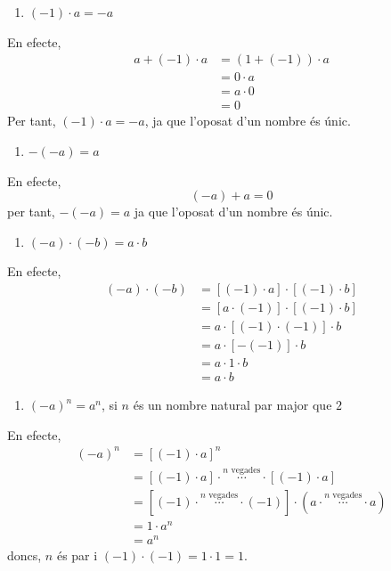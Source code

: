 \begin{enumerate}
\item[10.] $(-1)\cdot a=-a$
\end{enumerate}

En efecte,%
\begin{align*}
a+(-1)\cdot a &=(1+(-1))\cdot a \\
&=0\cdot a \\
&=a\cdot 0 \\
&=0
\end{align*}%
Per tant, $(-1)\cdot a=-a$, ja que l’oposat d’un nombre és únic.

\begin{enumerate}
\item[11.] $-(-a)=a$
\end{enumerate}

En efecte,%
\begin{equation*}
(-a)+a=0
\end{equation*}%
per tant, $-(-a)=a$ ja que l’oposat d’un nombre és únic.

\begin{enumerate}
\item[12.] $(-a)\cdot (-b)=a\cdot b$
\end{enumerate}

En efecte,%
\begin{align*}
(-a)\cdot (-b) &=\left[ (-1)\cdot a\right] \cdot \left[ (-1)\cdot b\right]
\\
&=\left[ a\cdot (-1)\right] \cdot \left[ (-1)\cdot b\right] \\
&=a\cdot \left[ (-1)\cdot (-1)\right] \cdot b \\
&=a\cdot \left[ -(-1)\right] \cdot b \\
&=a\cdot 1\cdot b \\
&=a\cdot b
\end{align*}

\begin{enumerate}
\item[13.] $(-a)^{n}=a^{n}$, si $n$ és un nombre natural par major que $%
2 $
\end{enumerate}

En efecte,%
\begin{align*}
(-a)^{n} &=\left[ (-1)\cdot a\right] ^{n} \\
&=\left[ (-1)\cdot a\right] \cdot \overset{n\text{ vegades}}{\cdots }\cdot%
\left[ (-1)\cdot a\right] \\
&=\left[ (-1)\cdot \overset{n\text{ vegades}}{\cdots }\cdot (-1)\right] \cdot
\left( a\cdot \overset{n\text{ vegades}}{\cdots }\cdot a\right) \\
&=1\cdot a^{n} \\
&=a^{n}
\end{align*}%
doncs, $n$ és par i $(-1)\cdot (-1)=1\cdot 1=1$.

